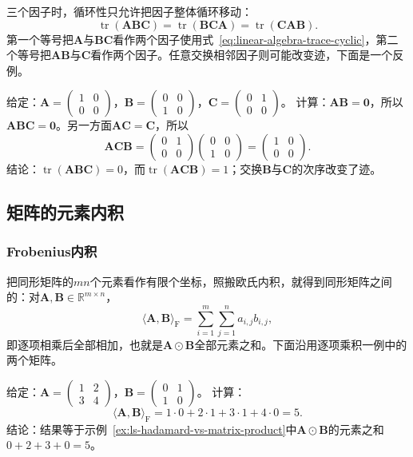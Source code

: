 三个因子时，循环性只允许把因子整体循环移动：
\[
 \operatorname{tr}(\bm A\bm B\bm C)=\operatorname{tr}(\bm B\bm C\bm A)=\operatorname{tr}(\bm C\bm A\bm B).
\]
第一个等号把$\bm A$与$\bm B\bm C$看作两个因子使用式~\eqref{eq:linear-algebra-trace-cyclic}，第二个等号把$\bm A\bm B$与$\bm C$看作两个因子。任意交换相邻因子则可能改变迹，下面是一个反例。
\begin{example}[反例：交换相邻因子会改变迹]
\label{ex:ls-trace-adjacent-swap}
给定：$\bm A=\left(\begin{smallmatrix}1&0\\0&0\end{smallmatrix}\right)$，$\bm B=\left(\begin{smallmatrix}0&0\\1&0\end{smallmatrix}\right)$，$\bm C=\left(\begin{smallmatrix}0&1\\0&0\end{smallmatrix}\right)$。
计算：$\bm A\bm B=\bm0$，所以$\bm A\bm B\bm C=\bm0$。另一方面$\bm A\bm C=\bm C$，所以
\[
 \bm A\bm C\bm B=\begin{pmatrix}0&1\\0&0\end{pmatrix}\begin{pmatrix}0&0\\1&0\end{pmatrix}=\begin{pmatrix}1&0\\0&0\end{pmatrix}.
\]
结论：$\operatorname{tr}(\bm A\bm B\bm C)=0$，而$\operatorname{tr}(\bm A\bm C\bm B)=1$；交换$\bm B$与$\bm C$的次序改变了迹。
\end{example}


\subsection{矩阵的元素内积}
\subsubsection{Frobenius内积}

把同形矩阵的$mn$个元素看作有限个坐标，照搬欧氏内积，就得到同形矩阵之间的：对$\bm A,\bm B\in\mathbb R^{m\times n}$，
\[
 \langle\bm A,\bm B\rangle_{\mathrm F}=\sum_{i=1}^m\sum_{j=1}^na_{i,j}b_{i,j},
\]
即逐项相乘后全部相加，也就是$\bm A\odot\bm B$全部元素之和。下面沿用逐项乘积一例中的两个矩阵。
\begin{example}[Frobenius内积的计算]
\label{ex:ls-frobenius-inner-product}
给定：$\bm A=\left(\begin{smallmatrix}1&2\\3&4\end{smallmatrix}\right)$，$\bm B=\left(\begin{smallmatrix}0&1\\1&0\end{smallmatrix}\right)$。
计算：
\[
 \langle\bm A,\bm B\rangle_{\mathrm F}=1\cdot0+2\cdot1+3\cdot1+4\cdot0=5.
\]
结论：结果等于示例~\ref{ex:ls-hadamard-vs-matrix-product}中$\bm A\odot\bm B$的元素之和$0+2+3+0=5$。
\end{example}

